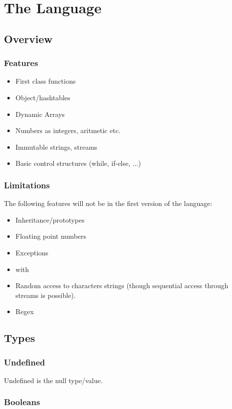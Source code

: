 \chapter{The Language}

\section{Overview}
\subsection{Features}

\begin{itemize}
\item First class functions
\item Object/hashtables
\item Dynamic Arrays
\item Numbers as integers, aritmetic etc.
\item Immutable strings, streams
\item Basic control structures (while, if-else, ...)
\end{itemize}

\subsection{Limitations}
The following features will not be in the first version of the language:
\begin{itemize}
\item Inheritance/prototypes
\item Floating point numbers
\item Exceptions
\item with
\item Random access to characters strings (though sequential access through streams is possible).
\item Regex
\end{itemize}

\section{Types}
\subsection{Undefined}
Undefined is the null type/value.

\subsection{Booleans}

